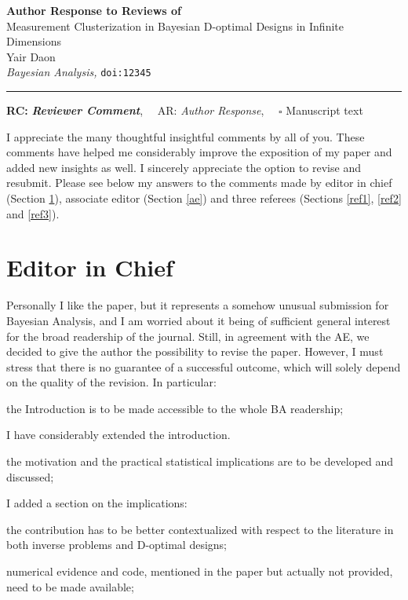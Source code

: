 \documentclass{article}
\def\papertitle{Measurement Clusterization in Bayesian D-optimal Designs in Infinite Dimensions}
\def\authors{Yair Daon}
\def\journal{Bayesian Analysis}
\def\doi{12345}
\providecommand{\lettertitle}{Author Response to Reviews of}
\providecommand{\papertitle}{Title}
\providecommand{\authors}{Authors}
\providecommand{\journal}{Journal}
\providecommand{\doi}{--}
\begin{document}
{\Large\bf \lettertitle}\\[1em]
{\huge \papertitle}\\[1em]
{\authors}\\
{\it \journal, }\texttt{doi:\doi}\\
\hrule

\hfill {\bfseries RC:} \textbf{\textit{Reviewer Comment}},\(\quad\) AR: \emph{Author Response}, \(\quad\square\) Manuscript text

I appreciate the many thoughtful insightful comments by all of
you. These comments have helped me considerably improve the exposition
of my paper and added new insights as well. I sincerely appreciate the
option to revise and resubmit. Please see below my answers to the
comments made by editor in chief (Section \ref{eic}), associate editor
(Section \ref{ae}) and three referees (Sections \ref{ref1}, \ref{ref2}
and \ref{ref3}).



\section{Editor in Chief}\label{eic}
\RC Personally I like the paper, but it represents a somehow unusual
submission for Bayesian Analysis, and I am worried about it being of
sufficient general interest for the broad readership of the
journal. Still, in agreement with the AE, we decided to give the
author the possibility to revise the paper. However, I must stress
that there is no guarantee of a successful outcome, which will solely
depend on the quality of the revision. In particular:

\RC the Introduction is to be made accessible to the whole BA
    readership;
    
\AR  I have considerably extended the introduction.
   
    
\RC the motivation and the practical statistical implications are to
be developed and discussed;

\AR I added a section on the implications:

   
    
\RC the contribution has to be better contextualized with respect to
the literature in both inverse problems and D-optimal designs;

    
\RC numerical evidence and code, mentioned in the paper but actually
not provided, need to be made available;
    
\end{document}
